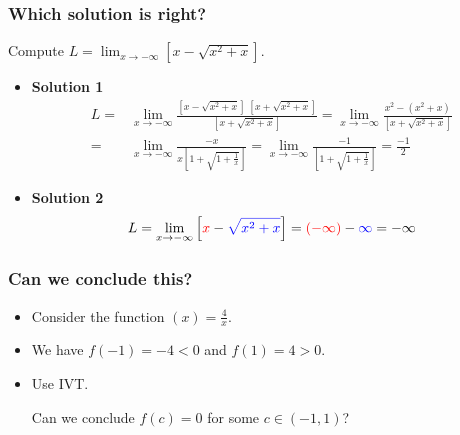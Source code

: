 \documentclass[14pt]{beamer}
\newcommand {\DS} [1] {${\displaystyle #1}$}
\newcommand{\setsize}[1]{\fontsize{#1}{#1}\selectfont} %
\begin{document}
\begin{frame}
\setsize{13}
\frametitle{Which solution is right?}
Compute \DS{L = \lim_{x \to -\infty} \left[  x - \sqrt{x^2+x} \right]}.

\begin{itemize}
	\item {\bf Solution 1}
{\setsize{11}
		\begin{align*}
			L = & \lim_{x\to -\infty} \frac{\left[  x - \sqrt{x^2+x} \right] \; \left[  x + \sqrt{x^2+x} \right]}{\left[  x + \sqrt{x^2+x} \right]}
			= \lim_{x \to -\infty} \frac{x^2-(x^2+x)}{\left[  x + \sqrt{x^2+x} \right]}
				\\
			=& \lim_{x \to -\infty}\frac{-x}{x \left[ 1 + \sqrt{1 + \frac{1}{x}} \right]} 
			= \lim_{x \to -\infty}\frac{-1}{ \left[ 1 + \sqrt{1 + \frac{1}{x}} \right]}
			= \frac{-1}{2}
		\end{align*}	
}
	\item  {\bf Solution 2}
		$$
			L = \lim_{x \to -\infty} \left[ {\color{red} x }- {\color{blue} \sqrt{x^2+x} }\right] = {\color{red}(-\infty)} - {\color{blue}\infty} = - \infty
		$$
\end{itemize}

\end{frame}
\begin{frame}
\frametitle{Can we conclude this?}

\begin{itemize}
	\item Consider the function \DS{(x)=\frac{4}{x}}.
\vfill
	\item We have \quad $f(-1)=-4<0$  \quad and \quad $f(1)=4>0$. 
\vfill
	\item Use IVT.
	
	 Can we conclude $f(c)=0$ for some $c\in(-1,1)$?
\end{itemize}
\vfill \vfill

\end{frame}
\end{document}
